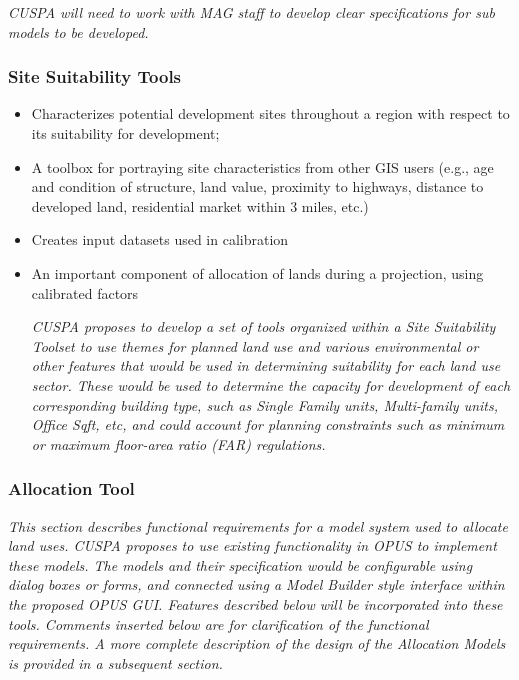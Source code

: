 \documentclass[titlepage]{article}
\begin{document}
\emph{CUSPA will need to work with MAG staff to develop clear specifications for sub models to be developed.}


\subsubsection{Site Suitability Tools}
\begin{itemize}
\item Characterizes potential development sites throughout a region with respect to its suitability for development;
\item A toolbox for portraying site characteristics from other GIS users (e.g., age and condition of structure, land value, proximity to highways, distance to developed land, residential market within 3 miles, etc.)
\item Creates input datasets used in calibration
\item An important component of allocation of lands during a projection, using calibrated factors

\emph{CUSPA proposes to develop a set of tools organized within a Site Suitability Toolset to use themes for planned land use and various environmental or other features that would be used in determining suitability for each land use sector.  These would be used to determine the capacity for development of each corresponding building type, such as Single Family units, Multi-family units, Office Sqft, etc, and could account for planning constraints such as minimum or maximum floor-area ratio (FAR) regulations.}

\end{itemize}

\subsubsection{Allocation Tool}

\emph{This section describes functional requirements for a model system used to allocate land uses.  CUSPA proposes to use existing functionality in OPUS to implement these models.  The models and their specification would be configurable using dialog boxes or forms, and connected using a Model Builder style interface within the proposed OPUS GUI.  Features described below will be incorporated into these tools.  Comments inserted below are for clarification of the functional requirements.  A more complete description of the design of the Allocation Models is provided in a subsequent section.}
\end{document}
